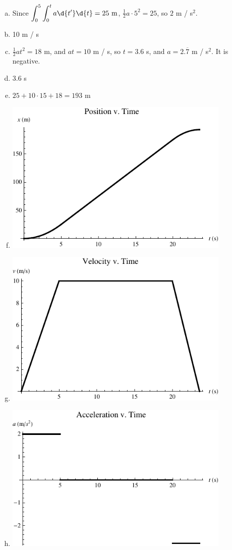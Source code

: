 \documentclass{esg8012pset}
\begin{document}
\begin{solution}
  \begin{enumerate}[a)]
    \item Since $\displaystyle \int_{0}^{5}\int_{0}^{t} a \d{t'}\d{t} = 25\ \text{m}$, $\frac{1}{2}a \cdot 5^2 = 25$, so $2$ m / s$^2$.
    \item 10 m / s
    \item $\frac{1}{2}at^2 = 18$ m, and $at = 10$ m / s, so $t = 3.6$ s, and $a = 2.\overline{7}$ m / s$^2$.  It is negative.
    \item 3.6 s
    \item $25 + 10 \cdot 15 + 18 = 193$ m
    \item \includegraphics[width=0.85\textwidth]{ps01_Plot_1}
    \item \includegraphics[width=0.85\textwidth]{ps01_Plot_2}
    \item \includegraphics[width=0.85\textwidth]{ps01_Plot_3}
  \end{enumerate}
\end{solution}
\end{document}
